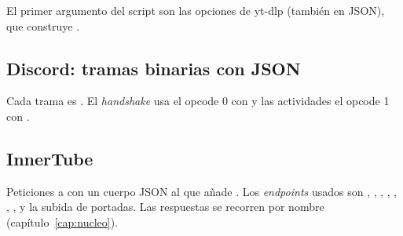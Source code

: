 El primer argumento del script son las opciones de yt-dlp (también en JSON), que construye
.

\subsection{Discord: tramas binarias con JSON}

Cada trama es \cod{[opcode u32 LE][longitud u32 LE][JSON]}. El \emph{handshake} usa el opcode
0 con  y las actividades el opcode 1 con
.

\subsection{InnerTube}

Peticiones  a  con un cuerpo
JSON al que  añade . Los \emph{endpoints} usados son
, , , , , ,
,  y la subida de portadas. Las respuestas
se recorren por nombre (capítulo~\ref{cap:nucleo}).
